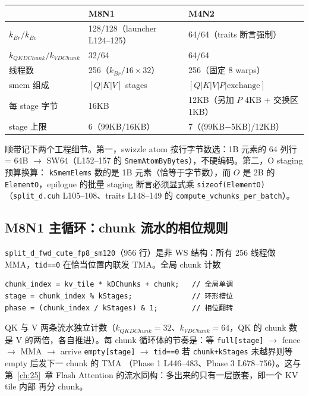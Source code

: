 \begin{center}
\begin{tabular}{@{}lll@{}}
\toprule
 & M8N1 & M4N2 \\
\midrule
$k_{Br}/k_{Bc}$ & 128/128（launcher L124--125） & 64/64（traits 断言强制） \\
$k_{QKDChunk}/k_{VDChunk}$ & 32/64 & 64/64 \\
线程数 & 256（$k_{Br}/16\times32$） & 256（固定 8 warps） \\
smem 组成 & $[Q|K|V]$ stages & $[Q|K|V|P|\text{exchange}]$ \\
每 stage 字节 & 16KB & 12KB（另加 $P$ 4KB + 交换区 1KB） \\
stage 上限 & 6（99KB/16KB） & 7（(99KB$-$5KB)/12KB） \\
\bottomrule
\end{tabular}
\end{center}

顺带记下两个工程细节。第一，swizzle atom 按行字节数选：1B
元素的 64 列行 = 64B $\to$ SW64（L152--157 的
\texttt{SmemAtomByBytes}），不硬编码。第二，O staging 预算换算：
\texttt{kSmemElems} 数的是 1B 元素（恰等于字节数），而 $O$ 是 2B 的
\texttt{ElementO}，epilogue 的批量 staging 断言必须显式乘
\texttt{sizeof(ElementO)}（\texttt{split\_d.cuh} L105--108、traits
L148--149 的 \texttt{compute\_vchunks\_per\_batch}）。

\subsection{M8N1 主循环：chunk 流水的相位规则}

\texttt{split\_d\_fwd\_cute\_fp8\_sm120}（956 行）是非 WS 结构：所有
256 线程做 MMA，\texttt{tid==0} 在恰当位置内联发 TMA。全局 chunk 计数
\begin{lstlisting}[aboveskip=4pt,belowskip=2pt]
chunk_index = kv_tile * kDChunks + chunk;   // 全局单调
stage = chunk_index % kStages;              // 环形槽位
phase = (chunk_index / kStages) & 1;        // 相位翻转
\end{lstlisting}
QK 与 V 两条流水独立计数（$k_{QKDChunk}=32$、$k_{VDChunk}=64$，QK 的 chunk
数是 V 的两倍，各自推进）。每 chunk 循环体的节奏是：等
\texttt{full[stage]} $\to$ fence $\to$ MMA $\to$ arrive
\texttt{empty[stage]} $\to$ \texttt{tid==0} 若
\texttt{chunk+kStages} 未越界则等 empty 后发下一 chunk 的 TMA
（Phase 1 L446--483、Phase 3 L678--756）。这与第~\ref{ch:25}~章
Flash Attention 的流水同构：多出来的只有一层嵌套，即一个 KV tile 内部
再分 chunk。

